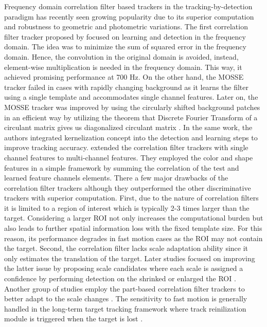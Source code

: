 \documentclass[10pt,twocolumn,letterpaper]{article}
\newcounter{ct}
\begin{document}
Frequency domain correlation filter based trackers in the
tracking-by-detection paradigm has recently seen growing popularity
due to its superior computation and robustness to geometric and
photometric variations. The first correlation filter tracker proposed
by \cite{bolme2010visual} focused on learning and detection in the
frequency domain. The idea was to minimize the sum of squared error in
the frequency domain. Hence, the convolution in the original domain is
avoided, instead, element-wise multiplication is needed in the
frequency domain. This way, it achieved promising performance at 700
Hz. On the other hand, the MOSSE tracker failed in cases with rapidly
changing background as it learns the filter using a single template
and accommodates single channel features. Later on, the MOSSE tracker
was improved by using the circularly shifted background patches in an
efficient way by utilizing the theorem that Discrete Fourier Transform
of a circulant matrix gives us diagonalized circulant matrix
\cite{henriques2012exploiting,henriques2015high}. In the same work,
the authors integrated kernelization concept into the detection and
learning steps to improve tracking
accuracy. \cite{galoogahi2013multi,henriques2015high} extended the
correlation filter trackers with single channel features to
multi-channel features. They employed the color and shape features in
a simple framework by summing the correlation of the test and learned
feature channels elements. There a few major drawbacks of the
correlation filter trackers although they outperformed the other
discriminative trackers with superior computation. First, due to the
nature of correlation filters it is limited to a region of interest
which is typically 2-3 times larger than the target. Considering a
larger ROI not only increases the computational burden but also leads
to further spatial information loss with the fixed template size. For
this reason, its performance degrades in fast motion cases as the ROI
may not contain the target. Second, the correlation filter lacks scale
adaptation ability since it only estimates the translation of the
target. Later studies focused on improving the latter issue by
proposing scale candidates where each scale is assigned a confidence
by performing detection on the shrinked or enlarged the ROI
\cite{li2014scale,tang2015multi,bibi2015multi,ma2015long}. Another
group of studies employ the part-based correlation filter trackers to
better adapt to the scale changes
\cite{liu2015real,akin2016deformable}. The sensitivity to fast motion
is generally handled in the long-term target tracking framework where
track reinilization module is triggered when the target is lost
\cite{ma2015long,de2015board,li2016monocular}.
\end{document}
